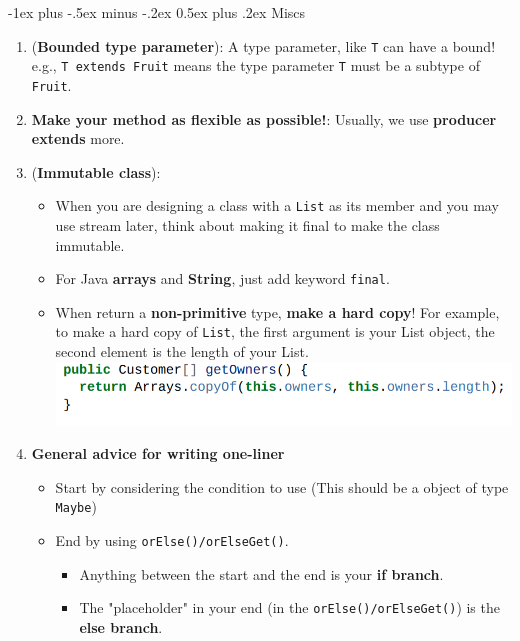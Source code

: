 \documentclass[10pt, landscape]{article}
\makeatletter
\renewcommand{\section}{\@startsection{section}{1}{0mm}%
                                {-1ex plus -.5ex minus -.2ex}%
                                {0.5ex plus .2ex}%
                                {\normalfont\large\bfseries}}
\makeatother
\begin{document}
\begin{multicols}{4}
\section{Miscs}
\begin{enumerate}
    \item (\textbf{Bounded type parameter}): A type parameter, like \texttt{T} can have a bound! e.g., \texttt{T extends Fruit} means the type parameter \texttt{T} must be a subtype of \texttt{Fruit}.
    \item \textbf{Make your method as flexible as possible!}: Usually, we use \textbf{producer extends} more.
    \item (\textbf{Immutable class}):
    \begin{itemize}
        \item When you are designing a class with a \texttt{List} as its member and you may use stream later, think about making it final to make the class immutable.
        \item For Java \textbf{arrays} and \textbf{String}, just add keyword \texttt{final}.
        \item When return a \textbf{non-primitive} type, \textbf{make a hard copy}! For example, to make a hard copy of \texttt{List}, the first argument is your List object, the second element is the length of your List. \\
        \includegraphics[width=1\linewidth]{PE/PE2/images/6.png}
    \end{itemize}
    \item \textbf{General advice for writing one-liner}
    \begin{itemize}
        \item Start by considering the condition to use (This should be a object of type \texttt{Maybe})
        \item End by using \texttt{orElse()/orElseGet()}.
        \begin{itemize}
            \item Anything between the start and the end is your \textbf{if branch}.
            \item The "placeholder" in your end (in the \texttt{orElse()/orElseGet()}) is the \textbf{else branch}.
        \end{itemize}
    \end{itemize}

\end{enumerate}
\end{multicols}
\end{document}
